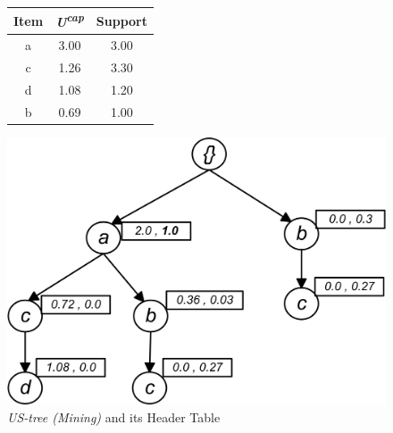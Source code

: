 \begin{figure}
\begin{minipage}{0.40\textwidth}
  \centering
  
	\begin{center}
	\begin{tabular}{ |c|c|c| } 
 	\hline
 		Item&\emph{U\textsuperscript{cap}}&Support\\ \hline\hline
 		a &  3.00  & 3.00\\ \hline
 		c &  1.26  & 3.30\\ \hline
 		d &  1.08  & 1.20\\ \hline
 		b &  0.69  & 1.00\\ \hline
\end{tabular}
\end{center}  
  
  
\end{minipage}
\hfill
\begin{minipage}{0.40\textwidth}
  \centering
  \includegraphics[width=\textwidth]{../images/M_TREE.jpg}
\end{minipage}
\caption{\emph{US-tree (Mining)} and its Header Table}
\label{figure:min_ready}
\end{figure}
%